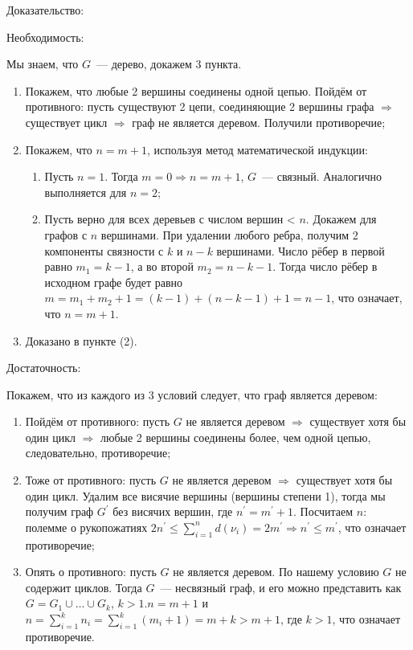 Доказательство:
\bigskip

Необходимость:

Мы знаем, что $G$~--- дерево, докажем 3 пункта.

\begin{enumerate}
    \item{Покажем, что любые 2 вершины соединены одной цепью. Пойдём от противного:
    пусть существуют 2 цепи, соединяющие 2 вершины графа $\Rightarrow$ существует
    цикл $\Rightarrow$ граф не является деревом. Получили противоречие;}
    \item{Покажем, что $n = m + 1$, используя метод математической индукции:
    
    \begin{enumerate}
        \item{Пусть $n = 1$. Тогда $m = 0 \Rightarrow n = m + 1$, $G$~--- связный.
        Аналогично выполняется для $n = 2$;}
        \item{Пусть верно для всех деревьев с числом вершин < $n$. Докажем для
        графов с $n$ вершинами. При удалении любого ребра, получим 2 компоненты
        связности с $k$ и $n - k$ вершинами. Число рёбер в первой равно $m_1 = k - 1$,
        а во второй $m_2 = n - k - 1$. Тогда число рёбер в исходном графе будет равно
        $m = m_1 + m_2 + 1 = (k - 1) + (n - k - 1) + 1 = n - 1$, что означает,
        что $n = m + 1$.}
    \end{enumerate}}
    \item{Доказано в пункте (2).}
\end{enumerate}
\bigskip

Достаточность:

Покажем, что из каждого из 3 условий следует, что граф является деревом:

\begin{enumerate}
    \item{Пойдём от противного: пусть $G$ не является деревом $\Rightarrow$
    существует хотя бы один цикл $\Rightarrow$ любые 2 вершины соединены более,
    чем одной цепью, следовательно, противоречие;}
    \item{Тоже от противного: пусть $G$ не является деревом $\Rightarrow$
    существует хотя бы один цикл. Удалим все висячие вершины (вершины степени 1),
    тогда мы получим граф $G^{'}$ без висячих вершин, где $n^{'} = m^{'} + 1$.
    Посчитаем $n$: полемме о рукопожатиях $2 n^{'} \leq \sum\limits^{n}_{i = 1}
    d(\nu_i) = 2m^{'} \Rightarrow n^{'} \leq m^{'}$, что означает противоречие;}
    \item{Опять о противного: пусть $G$ не является деревом. По нашему условию
    $G$ не содержит циклов. Тогда $G$~--- несвязный граф, и его можно представить как
    $G = G_1 \cup \dots \cup G_k$, $k > 1. n = m + 1$ и $n = \sum\limits^k_{i = 1}
    n_i = \sum\limits^k_{i = 1} (m_i + 1) = m + k > m + 1$, где $k > 1$,
    что означает противоречие.}
\end{enumerate}



